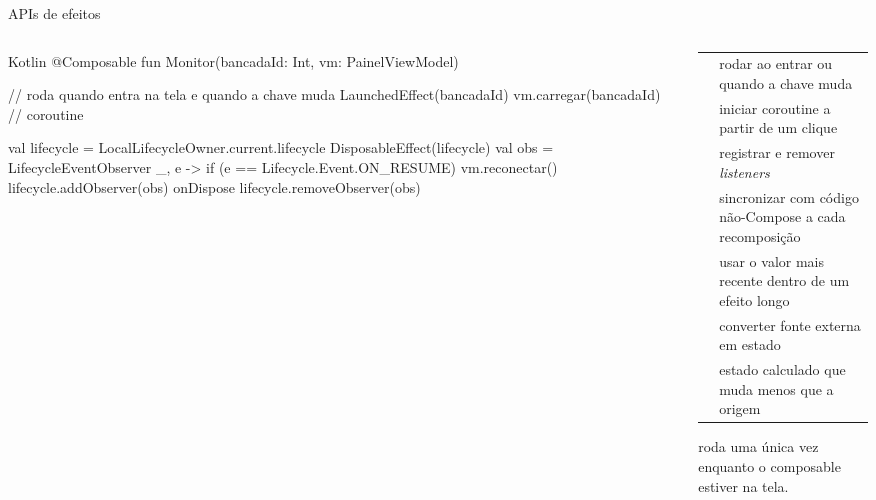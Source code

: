 \documentclass[aspectratio=169,10pt]{beamer}
\begin{document}
\begin{frame}[fragile]{APIs de efeitos}
  \begin{columns}[T]
    \begin{column}{0.5\textwidth}
\begin{codigo}[title=LaunchedEffect e DisposableEffect]{Kotlin}
@Composable
fun Monitor(bancadaId: Int, vm: PainelViewModel) {
  // roda quando entra na tela e quando a chave muda
  LaunchedEffect(bancadaId) {
    vm.carregar(bancadaId)   // coroutine
  }

  val lifecycle = LocalLifecycleOwner.current.lifecycle
  DisposableEffect(lifecycle) {
    val obs = LifecycleEventObserver { _, e ->
      if (e == Lifecycle.Event.ON_RESUME) vm.reconectar()
    }
    lifecycle.addObserver(obs)
    onDispose { lifecycle.removeObserver(obs) }
  }
}
\end{codigo}
    \end{column}
    \begin{column}{0.48\textwidth}
      \scriptsize
      \begin{tabularx}{\linewidth}{@{}l L@{}}
        \toprule
         &  \\
        \midrule
         & rodar  ao entrar ou quando a chave muda \\
         & iniciar coroutine a partir de um clique \\
         & registrar e remover \emph{listeners} \\
         & sincronizar com código não-Compose a cada recomposição \\
         & usar o valor mais recente dentro de um efeito longo \\
         & converter fonte externa em estado \\
         & estado calculado que muda menos que a origem \\
        \bottomrule
      \end{tabularx}
      \begin{atencao}
         roda uma única vez enquanto o composable estiver na tela.
      \end{atencao}
    \end{column}
  \end{columns}
\end{frame}
\end{document}

